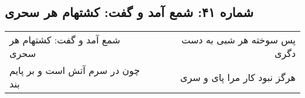 \begin{center}
\section*{شماره ۴۱: شمع آمد و گفت: کشتهام هر سحری}
\label{sec:041}
\begin{longtable}{l p{0.5cm} r}
شمع آمد و گفت: کشتهام هر سحری
&&
پس سوخته هر شبی به دست دگری
\\
چون در سرم آتش است و بر پایم بند
&&
هرگز نبود کار مرا پای و سری
\\
\end{longtable}
\end{center}
